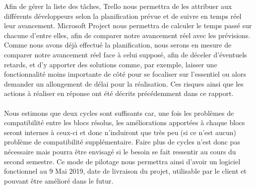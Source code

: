 Afin de gérer la liste des tâches, Trello nous permettra de les attribuer aux différents développeurs selon la planification prévue et de suivre en temps réel leur avancement. Microsoft Project nous permettra de calculer le temps passé sur chacune d’entre elles, afin de comparer notre avancement réel avec les prévisions. Comme nous avons déjà effectué la planification, nous serons en mesure de comparer notre avancement réel face à celui supposé, afin de déceler d’éventuels retards, et d’y apporter des solutions comme, par exemple, laisser une fonctionnalité moins importante de côté pour se focaliser sur l’essentiel ou alors demander un allongement de délai pour la réalisation. Ces risques ainsi que les actions à réaliser en réponse ont été décrits précédemment dans ce rapport.

\paragraph{}

Nous estimons que deux cycles sont suffisants car, une fois les problèmes de compatibilité entre les blocs résolus, les améliorations apportées à chaque blocs seront internes à ceux-ci et donc n’induiront que très peu (si ce n’est aucun) problème de compatibilité supplémentaire. Faire plus de cycles n’est donc pas nécessaire mais pourra être envisagé si le besoin se fait ressentir au cours du second semestre. Ce mode de pilotage nous permettra ainsi d’avoir un logiciel fonctionnel au 9 Mai 2019, date de livraison du projet, utilisable par le client et pouvant être amélioré dans le futur.















